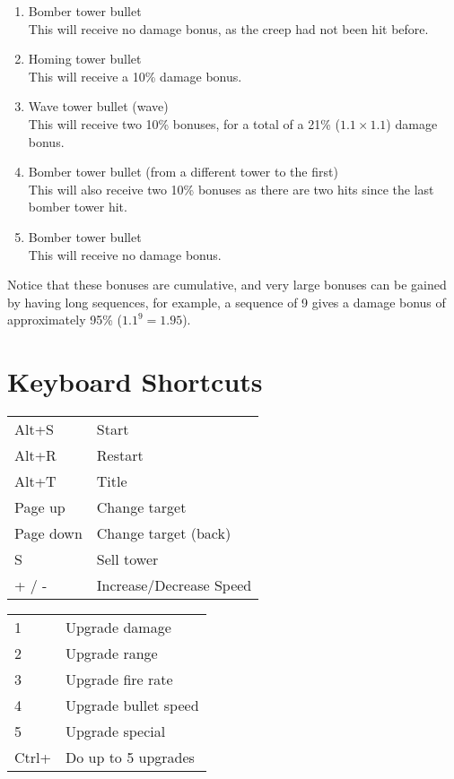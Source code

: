 \documentclass[a4paper,11pt]{article}
\begin{document}
\begin{enumerate}
 \item Bomber tower bullet\\
 This will receive no damage bonus, as the creep had not been hit before.
 \item Homing tower bullet\\
 This will receive a 10\% damage bonus.
 \item Wave tower bullet (wave)\\
 This will receive two 10\% bonuses, for a total of a 21\% (\(1.1 \times 1.1\)) damage bonus.
 \item Bomber tower bullet (from a different tower to the first)\\
 This will also receive two 10\% bonuses as there are two hits since the last bomber tower hit.
 \item Bomber tower bullet\\
 This will receive no damage bonus.
\end{enumerate}

Notice that these bonuses are cumulative, and very large bonuses can be gained by having long sequences, for example, a sequence of 9 gives a damage bonus of approximately 95\% (\(1.1^{9} = 1.95\)).

\section{Keyboard Shortcuts}

\begin{multicols}{2}
\begin{tabular}{l l}
Alt+S & Start\\
Alt+R & Restart\\
Alt+T & Title\\
Page up & Change target\\
Page down & Change target (back)\\
S & Sell tower\\
+ / - & Increase/Decrease Speed\\
\end{tabular}

\begin{tabular}{l l}
1 & Upgrade damage\\
2 & Upgrade range\\
3 & Upgrade fire rate\\
4 & Upgrade bullet speed\\
5 & Upgrade special\\
Ctrl+ & Do up to 5 upgrades\\
\end{tabular}
\end{multicols}
\end{document}
